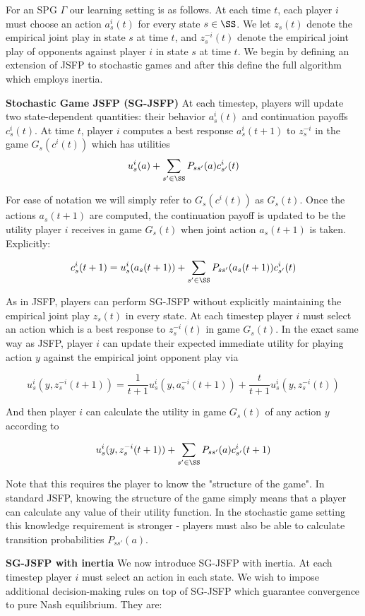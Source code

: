 For an SPG $\Gamma$ our learning setting is as follows. At each time $t$, each player $i$ must choose an action $a^i_s(t)$ for every state $s \in \SS$. We let $z_s(t)$ denote the empirical joint play in state $s$ at time $t$, and $z^{-i}_s(t)$ denote the empirical joint play of opponents against player $i$ in state $s$ at time $t$. We begin by defining an extension of JSFP to stochastic games and after this define the full algorithm which employs inertia.

{\bf Stochastic Game JSFP (SG-JSFP)} At each timestep, players will update two state-dependent quantities: their behavior $a^i_s(t)$ and continuation payoffs $c^i_s(t)$. At time $t$, player $i$ computes a best response $a^i_s(t+1)$ to $z_s^{-i}$ in the game  $G_s(c^i(t))$ which has utilities
$$
u^i_s(a) + \sum_{s' \in \SS} P_{ss'}(a) c^i_{s'}(t)
$$

For ease of notation we will simply refer to $G_s(c^i(t))$ as $G_s(t)$. Once the actions $a_s(t+1)$ are computed, the continuation payoff is updated to be the utility player $i$ receives in game $G_s(t)$ when joint action $a_s(t+1)$ is taken. Explicitly:

$$
c^i_s(t+1) = u^i_s(a_s(t+1)) + \sum_{s' \in \SS} P_{ss'}(a_s(t+1)) c^i_{s'}(t)
$$


As in JSFP, players can perform SG-JSFP without explicitly maintaining the empirical joint play $z_s(t)$ in every state. At each timestep player $i$ must select an action which is a best response to $z^{-i}_s(t)$ in game $G_s(t)$. In the exact same way as JSFP, player $i$ can update their expected immediate utility for playing action $y$ against the empirical joint opponent play via

$$
u^i_s(y, z^{-i}_s(t+1)) = \frac{1}{t+1} u^i_s(y, a^{-i}_s(t+1)) + \frac{t}{t+1}u^i_s(y, z^{-i}_s(t))
$$

And then player $i$ can calculate the utility in game $G_s(t)$ of any action $y$ according to

$$
u^i_s(y, z^{-i}_s(t+1)) + \sum_{s' \in \SS} P_{ss'}(a) c^i_{s'}(t+1)
$$

Note that this requires the player to know the "structure of the game". In standard JSFP, knowing the structure of the game simply means that a player can calculate any value of their utility function. In the stochastic game setting this knowledge requirement is stronger - players must also be able to calculate transition probabilities $P_{ss'}(a)$. 



{\bf SG-JSFP with inertia} We now introduce SG-JSFP with inertia. At each timestep player $i$ must select an action in each state. We wish to impose additional decision-making rules on top of SG-JSFP which guarantee convergence to pure Nash equilibrium. They are:

